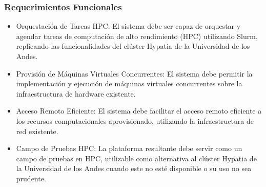 \subsubsection{Requerimientos Funcionales}
\begin{itemize}
    \item Orquestación de Tareas HPC: El sistema debe ser capaz de orquestar y agendar tareas de computación de alto rendimiento (HPC) utilizando Slurm, replicando las funcionalidades del clúster Hypatia de la Universidad de los Andes.
    \item Provisión de Máquinas Virtuales Concurrentes: El sistema debe permitir la implementación y ejecución de máquinas virtuales concurrentes sobre la infraestructura de hardware existente.
    \item Acceso Remoto Eficiente: El sistema debe facilitar el acceso remoto eficiente a los recursos computacionales aprovisionado, utilizando la infraestructura de red existente.
    \item Campo de Pruebas HPC: La plataforma resultante debe servir como un campo de pruebas en HPC, utilizable como alternativa al clúster Hypatia de la Universidad de los Andes cuando este no esté disponible o su uso no sea prudente.
\end{itemize}

